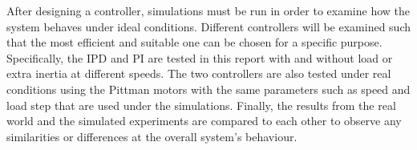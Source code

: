 After designing a controller, simulations must be run in order to examine how the system behaves under ideal conditions. 
Different controllers will be examined such that the most efficient and suitable one can be chosen for a specific purpose. 
Specifically, the IPD and PI are tested in this report with and without load or extra inertia at different speeds. 
The two controllers are also tested under real conditions using the Pittman motors with the same parameters such as speed and load step that are used under the simulations. 
Finally, the results from the real world and the simulated experiments are compared to each other to observe any similarities or differences at the overall system's behaviour.

